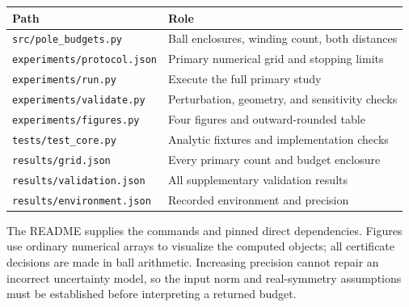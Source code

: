 \documentclass[11pt]{article}
\begin{document}
\begin{table}[h]\centering\small
\begin{tabular}{ll}\toprule
Path & Role\\\midrule
\texttt{src/pole\_budgets.py} & Ball enclosures, winding count, both distances\\
\texttt{experiments/protocol.json} & Primary numerical grid and stopping limits\\
\texttt{experiments/run.py} & Execute the full primary study\\
\texttt{experiments/validate.py} & Perturbation, geometry, and sensitivity checks\\
\texttt{experiments/figures.py} & Four figures and outward-rounded table\\
\texttt{tests/test\_core.py} & Analytic fixtures and implementation checks\\
\texttt{results/grid.json} & Every primary count and budget enclosure\\
\texttt{results/validation.json} & All supplementary validation results\\
\texttt{results/environment.json} & Recorded environment and precision\\\bottomrule
\end{tabular}
\end{table}
The README supplies the commands and pinned direct dependencies. Figures use ordinary numerical arrays to visualize the computed objects; all certificate decisions are made in ball arithmetic. Increasing precision cannot repair an incorrect uncertainty model, so the input norm and real-symmetry assumptions must be established before interpreting a returned budget.
\end{document}
